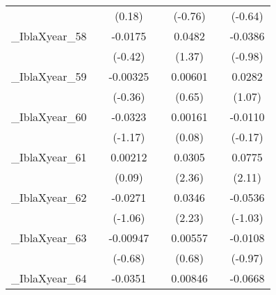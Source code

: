 {\begin{tabular}{l*{6}{c}}
            &                     &      (0.18)         &                     &     (-0.76)         &                     &     (-0.64)         \\
[1em]
\_IblaXyear\_58&                     &     -0.0175         &                     &      0.0482         &                     &     -0.0386         \\
            &                     &     (-0.42)         &                     &      (1.37)         &                     &     (-0.98)         \\
[1em]
\_IblaXyear\_59&                     &    -0.00325         &                     &     0.00601         &                     &      0.0282         \\
            &                     &     (-0.36)         &                     &      (0.65)         &                     &      (1.07)         \\
[1em]
\_IblaXyear\_60&                     &     -0.0323         &                     &     0.00161         &                     &     -0.0110         \\
            &                     &     (-1.17)         &                     &      (0.08)         &                     &     (-0.17)         \\
[1em]
\_IblaXyear\_61&                     &     0.00212         &                     &      0.0305\sym{*}  &                     &      0.0775\sym{*}  \\
            &                     &      (0.09)         &                     &      (2.36)         &                     &      (2.11)         \\
[1em]
\_IblaXyear\_62&                     &     -0.0271         &                     &      0.0346\sym{*}  &                     &     -0.0536         \\
            &                     &     (-1.06)         &                     &      (2.23)         &                     &     (-1.03)         \\
[1em]
\_IblaXyear\_63&                     &    -0.00947         &                     &     0.00557         &                     &     -0.0108         \\
            &                     &     (-0.68)         &                     &      (0.68)         &                     &     (-0.97)         \\
[1em]
\_IblaXyear\_64&                     &     -0.0351         &                     &     0.00846         &                     &     -0.0668\sym{***}\\

\end{tabular}}
